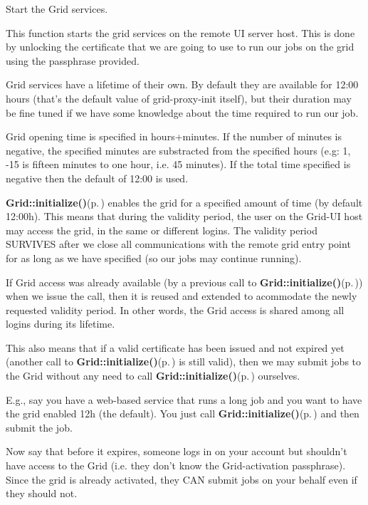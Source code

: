 Start the Grid services. 

This function starts the grid services on the remote UI server host. This is done by unlocking the certificate that we are going to use to run our jobs on the grid using the passphrase provided.

Grid services have a lifetime of their own. By default they are available for 12:00 hours (that's the default value of grid-proxy-init itself), but their duration may be fine tuned if we have some knowledge about the time required to run our job.

Grid opening time is specified in hours+minutes. If the number of minutes is negative, the specified minutes are substracted from the specified hours (e.g: 1, -15 is fifteen minutes to one hour, i.e. 45 minutes). If the total time specified is negative then the default of 12:00 is used.

{\bf Grid::initialize()}{\rm (p.\,\pageref{classGrid_a11})} enables the grid for a specified amount of time (by default 12:00h). This means that during the validity period, the user on the Grid-UI host may access the grid, in the same or different logins. The validity period SURVIVES after we close all communications with the remote grid entry point for as long as we have specified (so our jobs may continue running).

If Grid access was already available (by a previous call to {\bf Grid::initialize()}{\rm (p.\,\pageref{classGrid_a11})}) when we issue the call, then it is reused and extended to acommodate the newly requested validity period. In other words, the Grid access is shared among all logins during its lifetime.

This also means that if a valid certificate has been issued and not expired yet (another call to {\bf Grid::initialize()}{\rm (p.\,\pageref{classGrid_a11})} is still valid), then we may submit jobs to the Grid without any need to call {\bf Grid::initialize()}{\rm (p.\,\pageref{classGrid_a11})} ourselves.

E.g., say you have a web-based service that runs a long job and you want to have the grid enabled 12h (the default). You just call {\bf Grid::initialize()}{\rm (p.\,\pageref{classGrid_a11})} and then submit the job.

Now say that before it expires, someone logs in on your account but shouldn't have access to the Grid (i.e. they don't know the Grid-activation passphrase). Since the grid is already activated, they CAN submit jobs on your behalf even if they should not.

